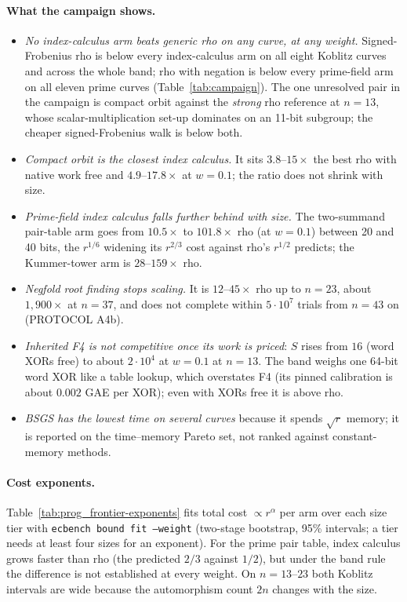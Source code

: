 \paragraph{What the campaign shows.}
\begin{itemize}
\item \emph{No index-calculus arm beats generic rho on any curve, at any
  weight.} Signed-Frobenius rho is below every index-calculus arm on all
  eight Koblitz curves and across the whole band; rho with negation is
  below every prime-field arm on all eleven prime curves
  (Table~\ref{tab:campaign}). The one unresolved pair in the campaign is
  compact orbit against the \emph{strong} rho reference at $n=13$, whose
  scalar-multiplication set-up dominates on an 11-bit subgroup; the
  cheaper signed-Frobenius walk is below both.
\item \emph{Compact orbit is the closest index calculus.} It sits
  $3.8$--$15\times$ the best rho with native work free and
  $4.9$--$17.8\times$ at $w=0.1$; the ratio does not shrink with size.
\item \emph{Prime-field index calculus falls further behind with size.}
  The two-summand pair-table arm goes from $10.5\times$ to $101.8\times$
  rho (at $w=0.1$) between 20 and 40 bits, the $r^{1/6}$ widening its
  $r^{2/3}$ cost against rho's $r^{1/2}$ predicts; the Kummer-tower arm is
  $28$--$159\times$ rho.
\item \emph{Negfold root finding stops scaling.} It is $12$--$45\times$
  rho up to $n=23$, about $1{,}900\times$ at $n=37$, and does not complete
  within $5\cdot10^7$ trials from $n=43$ on (PROTOCOL A4b).
\item \emph{Inherited F4 is not competitive once its work is priced}:
  $S$ rises from $16$ (word XORs free) to about $2\cdot10^4$ at
  $w=0.1$ at $n=13$. The band weighs one 64-bit word XOR like a table
  lookup, which overstates F4 (its pinned calibration is about
  $0.002$ GAE per XOR); even with XORs free it is above rho.
\item \emph{BSGS has the lowest time on several curves} because it spends
  $\sqrt r$ memory; it is reported on the time--memory Pareto set, not
  ranked against constant-memory methods.
\end{itemize}

\paragraph{Cost exponents.} Table~\ref{tab:prog_frontier-exponents} fits
total cost $\propto r^{\alpha}$ per arm over each size tier with
\texttt{ecbench bound fit --weight} (two-stage bootstrap, 95\% intervals; a
tier needs at least four sizes for an exponent). For the prime pair table,
index calculus grows faster than rho (the predicted $2/3$ against $1/2$),
but under the band rule the difference is not established at every
weight. On $n=13$--$23$ both Koblitz intervals are wide because the
automorphism count $2n$ changes with the size.

